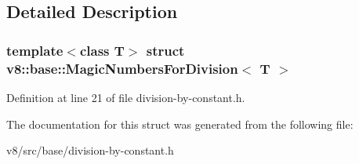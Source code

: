 \subsection{Detailed Description}
\subsubsection*{template$<$class T$>$\newline
struct v8\+::base\+::\+Magic\+Numbers\+For\+Division$<$ T $>$}



Definition at line 21 of file division-\/by-\/constant.\+h.



The documentation for this struct was generated from the following file\+:\begin{DoxyCompactItemize}
\item 
v8/src/base/division-\/by-\/constant.\+h\end{DoxyCompactItemize}
